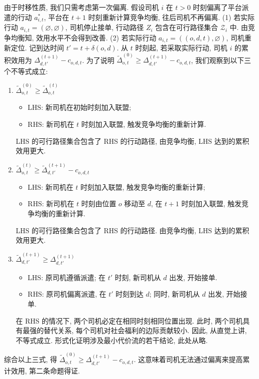 \documentclass[10pt,twocolumn]{article}
\begin{document}
由于时移性质, 我们只需考虑第一次偏离. 假设司机 $i$ 在 $t>0$ 时刻偏离了平台派遣的行动 $a^*_{i,t}$, 平台在 $t+1$ 时刻重新计算竞争均衡, 往后司机不再偏离. (1) 若实际行动 $a_{i,t} = (\varnothing, \varnothing)$, 司机停止接单, 行动路径 $Z_{i}$ 包含在可行路径集合 $\mathcal{Z}_{i}$ 中. 由竞争均衡知, 效用水平不会得到改善. (2) 若实际行动 $a_{i,t} = ((o, d, t), \varnothing)$, 司机重新定位. 记到达时间 $t' = t + \delta(o,d)$. 从 $t$ 时刻起, 若采取实际行动, 司机 $i$ 的累积效用为 $\Delta^{(t+1)}_{d, t'} - c_{o, d, t}$. 为了说明 $\tilde{\Delta}^{(0)}_{o, t} \ge \Delta^{(t+1)}_{d, t'} - c_{o, d, t}$, 我们观察到以下三个不等式成立:
\begin{enumerate}[label=(\roman*)]
  \item $\tilde{\Delta}^{(0)}_{o, t} \ge \tilde{\Delta}^{(t)}_{o, t}$
    \begin{itemize}[leftmargin=*]
      \item LHS: 新司机在初始时刻加入联盟;
      \item RHS: 新司机在 $t$ 时刻加入联盟, 触发竞争均衡的重新计算.
    \end{itemize}
    LHS 的可行路径集合包含了 RHS 的行动路径, 由竞争均衡, LHS 达到的累积效用更大.
  \item $\tilde{\Delta}^{(t)}_{o, t} \ge \tilde{\Delta}^{(t+1)}_{d, t'}-c_{o,d,t}$
    \begin{itemize}[leftmargin=*]
      \item LHS: 新司机在 $t$ 时刻加入联盟, 触发竞争均衡的重新计算;
      \item RHS: 新司机在 $t$ 时刻由位置 $o$ 移动至 $d$, 在 $t+1$ 时刻加入联盟, 触发竞争均衡的重新计算.
    \end{itemize}
    LHS 的可行路径集合包含了 RHS 的行动路径. 由竞争均衡, LHS 达到的累积效用更大.
  \item $\tilde{\Delta}^{(t+1)}_{d, t'} \ge \Delta^{(t+1)}_{d, t'}$
    \begin{itemize}[leftmargin=*]
      \item LHS: 原司机遵循派遣; 在 $t'$ 时刻, 新司机从 $d$ 出发, 开始接单.
      \item RHS: 原司机偏离派遣, 在 $t'$ 时刻到达 $d$; 同时, 新司机从 $d$ 出发, 开始接单.
    \end{itemize}
    在 RHS 的情况下, 两个司机必定在相同时刻相同位置出现. 此时, 两个司机具有最强的替代关系, 每个司机对社会福利的边际贡献较小. 因此, 从直觉上讲, 不等式成立. 形式化证明涉及最小代价流的若干结论, 此处从略.
\end{enumerate}

综合以上三式, 得 $\tilde{\Delta}^{(0)}_{o, t} \ge \Delta^{(t+1)}_{d, t'} - c_{o, d, t}$. 这意味着司机无法通过偏离来提高累计效用, 第二条命题得证.
\end{document}
